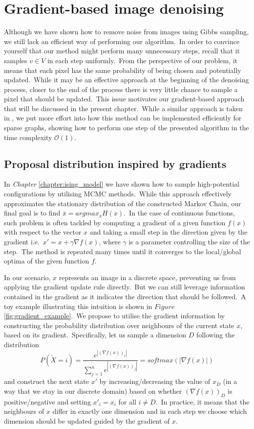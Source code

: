 \documentclass[a4paper, 11pt, onecolumn, openany, titlepage]{report}
\newcommand\numberedchapter[1]{\setlength\topskip{3cm}\chapter{#1}\setlength\topskip{0cm}}
\theoremstyle{default_theorem_style}\newtheorem{theorem}{Theorem}
\theoremstyle{default_theorem_style}\newtheorem{definition}{Definition}
\begin{document}
\numberedchapter{Gradient-based image denoising}

Although we have shown how to remove noise from images using Gibbs sampling, we still lack an efficient way of
performing our algorithm.\ In order to convince yourself that our method
might perform many unnecessary steps, recall that it samples $v \in V$ in each step uniformly.\ From the perspective
of our problem, it means that each pixel has the same probability of being chosen and potentially updated.\ While
it may be an effective approach at the beginning of the denoising process, closer to the end of the process there is
very little chance to sample a pixel that should be updated.\ This issue motivates our gradient-based approach
that will be discussed in the present chapter.\ While a similar approach is taken in \cite{oops_gradient}, we put
more effort into how this method can be implemented efficiently for sparse graphs, showing how to perform one
step of the presented algorithm in the time complexity $\mathcal{O}(1)$.

\section{Proposal distribution inspired by gradients}

In \textit{Chapter} \ref{chapter:ising_model} we have shown how to sample high-potential configurations by
utilising MCMC methods.\ While this approach effectively approximates the stationary distribution of the constructed
Markov Chain, our final goal is to find $\bar{x} = argmax_x H(x)$.\ In the case of continuous functions, such problem
is often tackled by computing a gradient of a given function $f(x)$ with respect to the vector $x$ and taking a small
step in the direction given by the gradient i.e.\ $x' = x + \gamma \nabla f(x)$, where $\gamma$ is a parameter
controlling the size of the step.\ The method is repeated many times until it converges to the local/global optima of
the given function $f$.\newline

In our scenario, $x$ represents an image in a discrete space, preventing us from applying the gradient update
rule directly.\ But we can still leverage information contained in the gradient as it indicates the direction that
should be followed.\ A toy example illustrating this intuition is shown in $Figure$ \ref{fig:gradient_example}.\ We
propose to utilise the gradient information by constructing the probability distribution over neighbours of the current
state $x$, based on its gradient.\ Specifically, let us sample a dimension $D$ following the distribution
$$
P(\tilde{X} = i) = \frac{e^{|(\nabla f(x))_i|}}{\sum\limits_{j = 1}^{n} e^{|(\nabla f(x))_j|}} =
softmax(|\nabla f(x)|)
$$
and construct the next state $x'$ by increasing/decreasing the value of
$x_D$ (in a way that we stay in our discrete domain) based on whether $(\nabla f(x))_D$ is positive/negative and setting
$x'_i = x_i$ for all $i \neq D$.\ In practice, it means that the neighbours of $x$ differ in exactly one dimension
and in each step we choose which dimension should be updated guided by the gradient of $x$.\newline
\end{document}
